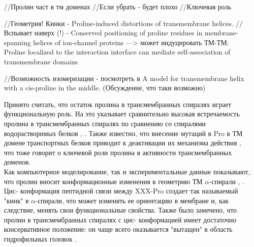 //Пролин част в тм доменах
//Если убрать - будет плохо
//Ключевая роль

//Геометрия! Кинки - Proline-induced distortions of transmembrane helices.
//Вспывает наверх (!) - Conserved positioning of proline residues in membrane-spanning helices of ion-channel proteins
---> может индуцировать ТМ-ТМ: Proline localized to the interaction interface can mediate self-association of transmembrane domains

//Возможность изомеризации - посмотреть в A model for transmembrane helix with a cis-proline in the middle. (Обсуждение, что таки возможно)

Принято считать, что остаток пролина в трансмембранных спиралях играет функциональную роль. На это указывает сравнительно высокая встречаемость пролина в трансмембранных спиралях по сравнению со спиралями водорастворимых белков \cite{prolineExp1}, \cite{bacteriorhodopsin}. Также известно, что внесение мутаций в Pro в ТМ домене транспортных белков приводит к деактивации их механизма действия \cite{prolineExp2}, что тоже говорит о ключевой роли пролина в активности трансмембранных доменов. \\

Как компьютерное моделирование, так и экспериментальные данные показывают, что пролин вносит конформационные изменения в геометрию ТМ $\alpha$-спирали \cite{model}, \cite{prolineDistortions}. Цис- конформация пептидной связи между XXX-Pro создает так называемый "кинк" в $\alpha$-спирали, что может изменять ее ориентацию в мембране и, как следствие, менять свои функциональные свойства. Также было замечено, что пролин в трансмембранных спиралях с цис- конформацией имеет достаточно консервативное положение: он чаще всего оказывается "вытащен" в область гидрофильных головок \cite{positioning}. 